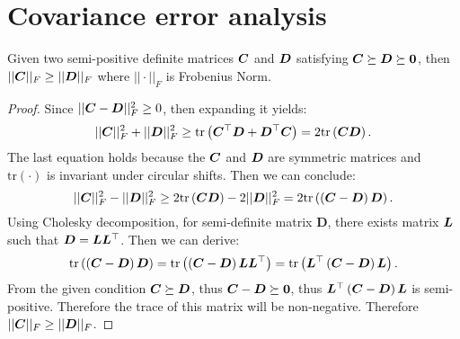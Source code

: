 \section{Covariance error analysis}
\label{appendix:theoretical_analysis}
\begin{theorem}
\label{theorem:4}
    Given two semi-positive definite matrices ${\bm{C}}$ and ${\bm{D}}$ satisfying ${\bm{C}}\succeq{\bm{D}}\succeq\mathbf{0}$, then $||{\bm{C}}||_F \ge ||{\bm{D}}||_F$ where $||\cdot||_F$ is Frobenius Norm.
\end{theorem}
\begin{proof}
Since $||{\bm{C}}-{\bm{D}}||_F^2\ge 0$, then expanding it yields:
\begin{equation}
    ||{\bm{C}}||_F^2 + ||{\bm{D}}||_F^2\ge \mathrm{tr}\left({\bm{C}}^\top{\bm{D}}+{\bm{D}}^\top{\bm{C}}\right) = 2\mathrm{tr}\left({\bm{C}}{\bm{D}}\right).
\end{equation}
The last equation holds because the ${\bm{C}}$ and ${\bm{D}}$ are symmetric matrices and $\mathrm{tr}(\cdot)$ is invariant under circular shifts.
Then we can conclude:
\begin{equation}
    ||{\bm{C}}||_F^2 - ||{\bm{D}}||_F^2  
    \ge  2\mathrm{tr}\left({\bm{C}}{\bm{D}}\right) - 2||{\bm{D}}||_F^2   
    = 2\mathrm{tr}\left(\left({\bm{C}}-{\bm{D}}\right){\bm{D}}\right).  
\end{equation}
Using Cholesky decomposition, for semi-definite matrix $\mathbf D$, there exists matrix ${\bm{L}}$ such that ${\bm{D}}={\bm{L}}{\bm{L}}^\top$. Then we can derive:
\begin{equation}
    \mathrm{tr}\left(\left({\bm{C}}-{\bm{D}}\right){\bm{D}}\right)
    = \mathrm{tr}\left(\left({\bm{C}}-{\bm{D}}\right){\bm{L}}{\bm{L}}^\top\right) 
    = \mathrm{tr}\left({\bm{L}}^\top\left({\bm{C}}-{\bm{D}}\right){\bm{L}}\right). 
\end{equation}
From the given condition ${\bm{C}}\succeq{\bm{D}}$, thus ${\bm{C}}-{\bm{D}}\succeq\mathbf{0}$, thus ${\bm{L}}^\top\left({\bm{C}}-{\bm{D}}\right){\bm{L}}$ is semi-positive. Therefore the trace of this matrix will be non-negative. Therefore $||{\bm{C}}||_F \ge ||{\bm{D}}||_F$.
\end{proof}

